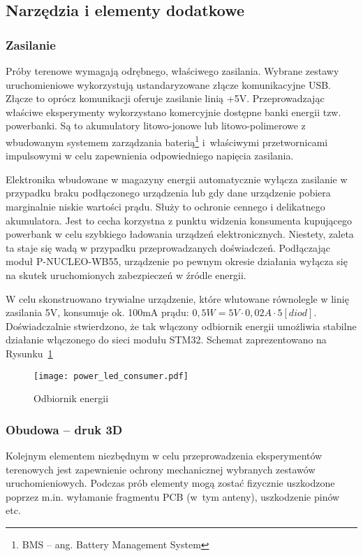 \subsection{Narzędzia i elementy dodatkowe}

\subsubsection{Zasilanie}
Próby terenowe wymagają odrębnego, właściwego zasilania. Wybrane zestawy uruchomieniowe
wykorzystują ustandaryzowane złącze komunikacyjne USB. Złącze to oprócz komunikacji
oferuje zasilanie linią +5V. Przeprowadzając właściwe eksperymenty wykorzystano
komercyjnie dostępne banki energii tzw. powerbanki. Są to akumulatory litowo-jonowe
lub litowo-polimerowe z wbudowanym systemem zarządzania baterią\footnote{\gls{BMS} -- ang. Battery Management System}
i~właściwymi przetwornicami impulsowymi w celu zapewnienia odpowiedniego napięcia zasilania.

Elektronika wbudowane w magazyny energii automatycznie wyłącza zasilanie w przypadku braku
podłączonego urządzenia lub gdy dane urządzenie pobiera marginalnie niskie wartości
prądu. Służy to ochronie cennego i delikatnego akumulatora. Jest to cecha korzystna
z punktu widzenia konsumenta kupującego powerbank w celu szybkiego ładowania urządzeń elektronicznych.
Niestety, zaleta ta staje się wadą w przypadku przeprowadzanych doświadczeń. Podłączając moduł P-NUCLEO-WB55,
urządzenie po pewnym okresie działania wyłącza się na skutek uruchomionych zabezpieczeń w źródle energii.

W celu skonstruowano trywialne urządzenie, które wlutowane równolegle w linię zasilania 5V,
konsumuje ok. 100mA prądu: $0,5W = 5V \cdot 0,02A \cdot 5 [diod]$. Doświadczalnie stwierdzono, że tak włączony
odbiornik energii umożliwia stabilne działanie włączonego do sieci modułu STM32. Schemat 
zaprezentowano na Rysunku~\ref{rys:power_led_consumer}

\begin{figure}[!ht]
	\centering \texttt{[image: power\_led\_consumer.pdf]}
	\caption{Odbiornik energii}
	\label{rys:power_led_consumer}
\end{figure}

\subsubsection{Obudowa -- druk 3D}
Kolejnym elementem niezbędnym w celu przeprowadzenia eksperymentów terenowych jest zapewnienie
ochrony mechanicznej wybranych zestawów uruchomieniowych. Podczas prób elementy mogą zostać
fizycznie uszkodzone poprzez m.in. wyłamanie fragmentu \gls{PCB} (w~tym anteny), uszkodzenie pinów etc.

